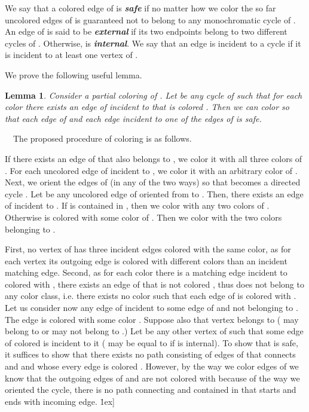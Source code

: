 \documentclass[a4, 11pt]{article}
\newcommand{\dowod}{\noindent{\bf Proof.~}}
\newcommand{\koniec}{\hfill \.1ex]}
\newcommand{\<}{\langle}
\renewcommand{\>}{\rangle}
\newtheorem{lemma}{Lemma}
\begin{document}
We say that a colored edge  of    is {\bf \em safe}  if no matter how we color the so far uncolored edges of   is guaranteed not to belong to any monochromatic cycle of . An edge  of  is said to be {\bf \em external} if its two endpoints belong to two different cycles of . Otherwise,  is {\bf \em internal}.
We say that an edge  is incident to a cycle  if it is incident to at least one vertex of .

We prove the following useful lemma.
\begin{lemma} \label{col}
Consider a partial coloring of . Let  be any cycle of  such that for each color  there exists an edge of  incident to  that is colored . Then we can color  so that each edge of  and each edge incident to one of the edges of  is safe.
\end{lemma}

\dowod   \ \ The proposed procedure of coloring  is as follows.

If there exists an edge of  that also belongs to , we color it with all three colors of . For each uncolored edge of  incident to , we color it with an arbitrary color of .
Next, we orient the edges of  (in any of the two ways) so that  becomes a directed cycle . Let  be any  uncolored edge of  oriented from  to . Then, there exists an edge  of  incident to . If  is contained in , then we color  with any two colors of . Otherwise  is colored with some color  of .
Then we color  with the two colors belonging to .

First, no vertex of  has three incident edges colored with the same color, as for each vertex its outgoing edge is colored with different colors than an incident matching edge.  Second, as for each color  there is a matching edge incident to  colored with , there exists an edge of  that is not colored , thus  does not belong to any color class, i.e. there exists no color  such that each edge of  is colored with .  Let us consider now any edge   of  incident to some edge of  and not belonging to .  The edge  is colored with some color . 
Suppose also that  vertex   belongs to  ( may  belong to  or  may not belong to .) Let  be any other vertex of  such that some edge of   colored  is incident to it  ( may be equal to  if  is internal). 
To show that  is safe, it suffices to show that there exists no path consisting of edges of  that connects  and  and whose every edge is colored .  However, by the way we color edges of  we know that the outgoing edges of  and  are not colored with  because of the way we oriented the cycle, there is no path connecting  and  contained in  that starts and ends with incoming edge. \koniec
\end{document}
